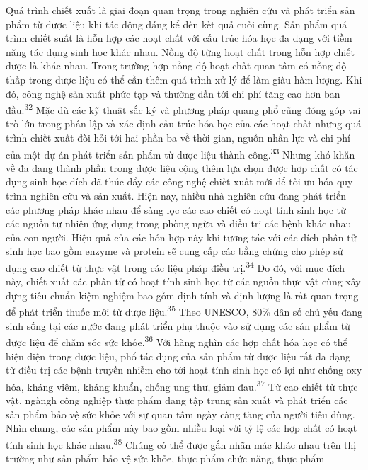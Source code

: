 \documentclass[
  letterpaper,
  DIV=11,
  numbers=noendperiod]{scrartcl}
\begin{document}
Quá trình chiết xuất là giai đoạn quan trọng trong nghiên cứu và phát
triển sản phẩm từ dược liệu khi tác động đáng kể đến kết quả cuối cùng.
Sản phẩm quá trình chiết suất là hỗn hợp các hoạt chất với cấu trúc hóa
học đa dạng với tiềm năng tác dụng sinh học khác nhau. Nồng độ từng hoạt
chất trong hỗn hợp chiết được là khác nhau. Trong trường hợp nồng độ
hoạt chất quan tâm có nồng độ thấp trong dược liệu có thể cần thêm quá
trình xử lý để làm giàu hàm lượng. Khi đó, công nghệ sản xuất phức tạp
và thường dẫn tới chi phí tăng cao hơn ban đầu.\textsuperscript{32} Mặc
dù các kỹ thuật sắc ký và phương pháp quang phổ cũng đóng góp vai trò
lớn trong phân lập và xác định cấu trúc hóa học của các hoạt chất nhưng
quá trình chiết xuất đòi hỏi tới hai phần ba về thời gian, nguồn nhân
lực và chi phí của một dự án phát triển sản phẩm từ dược liệu thành
công.\textsuperscript{33} Nhưng khó khăn về đa dạng thành phần trong
dược liệu cộng thêm lựa chọn được hợp chất có tác dụng sinh học đích đã
thúc đẩy các công nghệ chiết xuất mới để tối ưu hóa quy trình nghiên cứu
và sản xuất. Hiện nay, nhiều nhà nghiên cứu đang phát triển các phương
pháp khác nhau để sàng lọc các cao chiết có hoạt tính sinh học từ các
nguồn tự nhiên ứng dụng trong phòng ngừa và điều trị các bệnh khác nhau
của con người. Hiệu quả của các hỗn hợp này khi tương tác với các đích
phân tử sinh học bao gồm enzyme và protein sẽ cung cấp các bằng chứng
cho phép sử dụng cao chiết từ thực vật trong các liệu pháp điều
trị.\textsuperscript{34} Do đó, với mục đích này, chiết xuất các phân tử
có hoạt tính sinh học từ các nguồn thực vật cùng xây dựng tiêu chuẩn
kiệm nghiệm bao gồm định tính và định lượng là rất quan trọng để phát
triển thuốc mới từ dược liệu.\textsuperscript{35} Theo UNESCO, 80\% dân
số chủ yếu đang sinh sống tại các nước đang phát triển phụ thuộc vào sử
dụng các sản phẩm từ dược liệu để chăm sóc sức khỏe.\textsuperscript{36}
Với hàng nghìn các hợp chất hóa học có thể hiện diện trong dược liệu,
phổ tác dụng của sản phẩm từ dược liệu rất đa dạng từ điều trị các bệnh
truyền nhiễm cho tới hoạt tính sinh học có lợi như chống oxy hóa, kháng
viêm, kháng khuẩn, chống ung thư, giảm đau.\textsuperscript{37} Từ cao
chiết từ thực vật, ngàngh công nghiệp thực phẩm đang tập trung sản xuất
và phát triển các sản phẩm bảo vệ sức khỏe với sự quan tâm ngày càng
tăng của người tiêu dùng. Nhìn chung, các sản phẩm này bao gồm nhiều
loại với tỷ lệ các hợp chất có hoạt tính sinh học khác
nhau.\textsuperscript{38} Chúng có thể được gắn nhãn mác khác nhau trên
thị trường như sản phẩm bảo vệ sức khỏe, thực phẩm chức năng, thực phẩm
\end{document}
